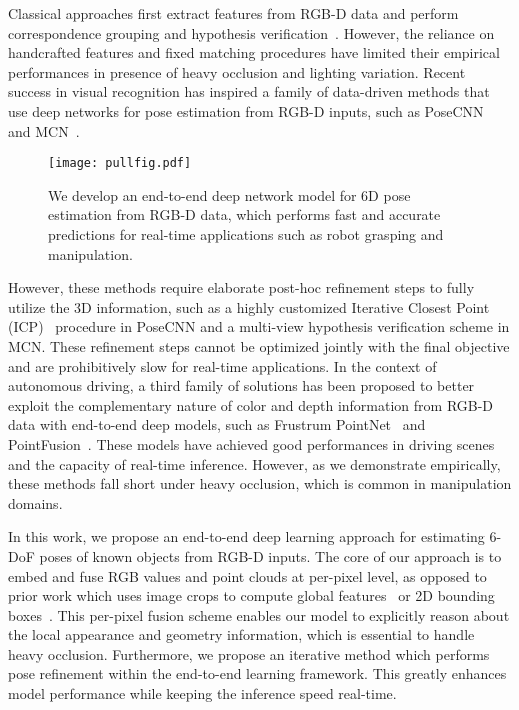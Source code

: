 \documentclass[10pt,twocolumn,letterpaper]{article}
\begin{document}
Classical approaches first extract features from RGB-D data and perform correspondence grouping and hypothesis verification~\cite{hinterstoisser2012model,Hinterstoier2011MultimodalTF,rios2013discriminatively,kehl2016deep,tejani2014latent,wohlhart2015learning,brachmann2014learning}. However, the reliance on handcrafted features and fixed matching procedures have limited their empirical performances in presence of heavy occlusion and lighting variation. Recent success in visual recognition has inspired a family of data-driven methods that use deep networks for pose estimation from RGB-D inputs, such as PoseCNN~\cite{xiang2017posecnn} and MCN~\cite{li2018unified}.

\begin{figure}[t]
	\centering
	\texttt{[image: pullfig.pdf]}
	\caption{We develop an end-to-end deep network model for 6D pose estimation from RGB-D data, which performs fast and accurate predictions for real-time applications such as robot grasping and manipulation.}
	\label{fig:pull}
	\vspace{-15pt}
\end{figure}

However, these methods require elaborate post-hoc refinement steps to fully utilize the 3D information, such as a highly customized Iterative Closest Point (ICP)~\cite{Besl1992AMF} procedure in PoseCNN and a multi-view hypothesis verification scheme in MCN. These refinement steps cannot be optimized jointly with the final objective and are prohibitively slow for real-time applications. In the context of autonomous driving, a third family of solutions has been proposed to better exploit the complementary nature of color and depth information from RGB-D data with end-to-end deep models, such as Frustrum PointNet~\cite{qi2017frustum} and PointFusion~\cite{xu2017pointfusion}. These models have achieved good performances in driving scenes and the capacity of real-time inference. However, as we demonstrate empirically, these methods fall short under heavy occlusion, which is common in manipulation domains.

In this work, we propose an end-to-end deep learning approach for estimating 6-DoF poses of known objects from RGB-D inputs. 
The core of our approach is to embed and fuse RGB values and point clouds at per-pixel level, as opposed to prior work which uses image crops to compute global features~\cite{xu2017pointfusion} or 2D bounding boxes~\cite{qi2017frustum}. This per-pixel fusion scheme enables our model to explicitly reason about the local appearance and geometry information, which is essential to handle heavy occlusion. Furthermore, we propose an iterative method which performs pose refinement within the end-to-end learning framework. This greatly enhances model performance while keeping the inference speed real-time.
\end{document}
